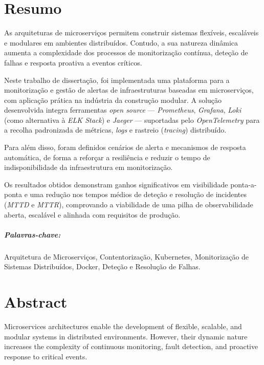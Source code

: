 \chapter*{Resumo}

As arquiteturas de microserviços permitem construir sistemas flexíveis, escaláveis e modulares em ambientes distribuídos. Contudo, a sua natureza dinâmica aumenta a complexidade dos processos de monitorização contínua, deteção de falhas e resposta proativa a eventos críticos.

Neste trabalho de dissertação, foi implementada uma plataforma para a monitorização e gestão de alertas de infraestruturas baseadas em microserviços, com aplicação prática na indústria da construção modular. A solução desenvolvida integra ferramentas \textit{open source} — \textit{Prometheus}, \textit{Grafana}, \textit{Loki} (como alternativa à \textit{ELK Stack}) e \textit{Jaeger} — suportadas pelo \textit{OpenTelemetry} para a recolha padronizada de métricas, \textit{logs} e rastreio (\textit{tracing}) distribuído.

Para além disso, foram definidos cenários de alerta e mecanismos de resposta automática, de forma a reforçar a resiliência e reduzir o tempo de indisponibilidade da infraestrutura em monitorização.

Os resultados obtidos demonstram ganhos significativos em visibilidade ponta-a-ponta e uma redução nos tempos médios de deteção e resolução de incidentes (\textit{MTTD} e \textit{MTTR}), comprovando a viabilidade de uma pilha de observabilidade aberta, escalável e alinhada com requisitos de produção.


\paragraph{Palavras-chave:} Arquitetura de Microserviços, Contentorização, Kubernetes, Monitorização de Sistemas Distribuídos, Docker, Deteção e Resolução de Falhas.


\cleardoublepage

\chapter*{Abstract}

Microservices architectures enable the development of flexible, scalable, and modular systems in distributed environments. However, their dynamic nature increases the complexity of continuous monitoring, fault detection, and proactive response to critical events.

